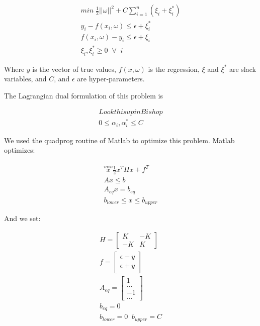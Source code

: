 \documentclass[journal]{IEEEtran}
\begin{document}
\begin{gather}
min\; \frac{1}{2} || \omega ||^2 + C \sum_{i = 1}^{n} (\xi_i + \xi_i^*)\\
\nonumber y_i - f(x_i, \omega) \leq \epsilon + \xi_i^*\\
\nonumber f(x_i, \omega) - y_i \leq \epsilon + \xi_i\\
\nonumber \xi_i, \xi_i^* \geq 0 \; \; \forall \; \; i
\end{gather}

\noindent
Where $y$ is the vector of true values, $f(x, \omega)$ is the regression, $\xi$ and $\xi^*$ are slack variables, and $C$, and $\epsilon$ are hyper-parameters.

The Lagrangian dual formulation of this problem is

\begin{gather}
Look this up in Bishop\\
\nonumber 0 \leq \alpha_i , \alpha_i^* \leq C
\end{gather}


We used the quadprog routine of Matlab to optimize this problem. Matlab optimizes:

\begin{gather}
\overset{min}{x} \frac{1}{2}x^T H x + f^T\\
\nonumber A x \leq b\\
\nonumber A_{eq} x = b_{eq}\\
\nonumber b_{lower} \leq x \leq b_{upper}
\end{gather}

\noindent And we set:

\begin{gather}
H = 
\begin{bmatrix}
K & -K\\
-K & K
\end{bmatrix}\\
f =
\begin{bmatrix}
\epsilon - y\\
\epsilon + y
\end{bmatrix}\\
A_{eq} = 
\begin{bmatrix}
1 \\
\dots \\
-1 \\
\dots
\end{bmatrix}\\
b_{eq} = 0\\
b_{lower} = 0 \; \; b_{upper} = C
\end{gather}
\end{document}
